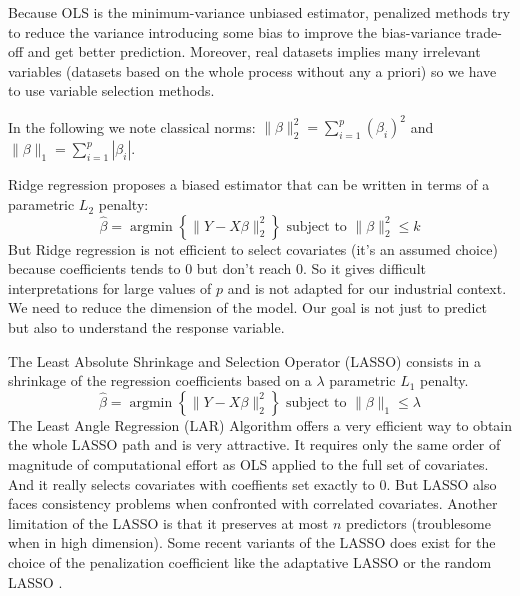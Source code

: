 \documentclass[11pt,a4paper]{article}
\begin{document}
	Because OLS is the minimum-variance unbiased estimator, penalized methods try to reduce the variance introducing some bias to improve the bias-variance trade-off and get better prediction.
Moreover, real datasets implies many irrelevant variables (datasets based on the whole process without any a priori) so we have to use variable selection methods.

In the following we note classical norms: $\parallel\beta\parallel_2^2=\sum_{i=1}^p(\beta_i)^2$ and $\parallel\beta \parallel_1=\sum_{i=1}^p|\beta_i| $.

	Ridge regression\cite{marquardt1975ridge} proposes a biased estimator that can be written in terms of a parametric $L_2$ penalty:
	\begin{equation}
		 \hat{\beta}=\operatorname{argmin} \left\lbrace \parallel Y-X\beta\parallel_2^2 \right\rbrace \textrm{ subject to } \parallel\beta\parallel_2^2\leq k
	\end{equation}
	But Ridge regression is not efficient to select covariates (it's an assumed choice) because coefficients tends to 0 but don't reach 0.
	So it gives difficult interpretations for large values of $p$ and is not adapted for our industrial context. We need to reduce the dimension of the model. Our goal is not just to predict but also to understand the response variable.
	

	
	
	
	The Least Absolute Shrinkage and Selection Operator (LASSO)\cite{tibshirani1996regression} consists in a shrinkage of the regression coefficients based on a $\lambda$ parametric $L_1$ penalty.
		\begin{equation}
		 \hat{\beta}=\operatorname{argmin} \left\lbrace \parallel Y-X\beta\parallel_2^2 \right\rbrace \textrm{ subject to } \parallel\beta\parallel_1\leq \lambda
		\end{equation}	
	 The Least Angle Regression\cite{efron2004least} (LAR) Algorithm offers a very efficient way to obtain the whole LASSO path and is very attractive. It requires only the same order of magnitude of computational effort as OLS applied to the full set of covariates. And it  really selects covariates with coeffients set exactly to 0.
	 But LASSO also faces consistency problems \cite{Zhao2006MSC} when confronted  with correlated covariates. Another limitation of the LASSO is that it preserves at most $n$ predictors (troublesome when in high dimension). Some recent variants of the LASSO does exist for the choice of the penalization coefficient like the adaptative LASSO \cite{zou2006adaptive} or the random LASSO \cite{wang2011random}.
	 \\
	 
\end{document}
